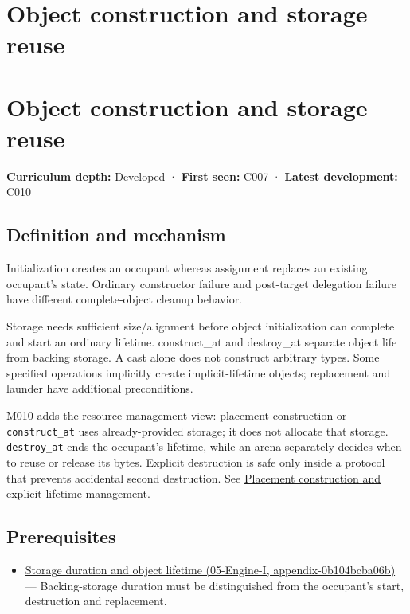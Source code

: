 \hypertarget{appendix-a82f9c438857}{}
\section*{Object construction and storage reuse}
\section{Object construction and storage reuse}\label{appendix-a82f9c438857-object-construction-and-storage-reuse}

\textbf{Curriculum depth:} Developed · \textbf{First seen:} C007 · \textbf{Latest development:} C010

\subsection{Definition and mechanism}\label{appendix-a82f9c438857-definition-and-mechanism}

Initialization creates an occupant whereas assignment replaces an existing occupant's state. Ordinary constructor failure and post-target delegation failure have different complete-object cleanup behavior.

Storage needs sufficient size/alignment before object initialization can complete and start an ordinary lifetime. construct\_at and destroy\_at separate object life from backing storage. A cast alone does not construct arbitrary types. Some specified operations implicitly create implicit-lifetime objects; replacement and launder have additional preconditions.

M010 adds the resource-management view: placement construction or \texttt{construct\_at} uses already-provided storage; it does not allocate that storage. \texttt{destroy\_at} ends the occupant's lifetime, while an arena separately decides when to reuse or release its bytes. Explicit destruction is safe only inside a protocol that prevents accidental second destruction. See \hyperref[appendix-f56c3e43fd4e]{Placement construction and explicit lifetime management}.

\subsection{Prerequisites}\label{appendix-a82f9c438857-prerequisites}

\begin{itemize}
\tightlist
\item
  \href{../05-Engine-I/main.pdf\#nameddest=appendix-0b104bcba06b}{Storage duration and object lifetime (05-Engine-I, appendix-0b104bcba06b)} --- Backing-storage duration must be distinguished from the occupant's start, destruction and replacement.
\end{itemize}

